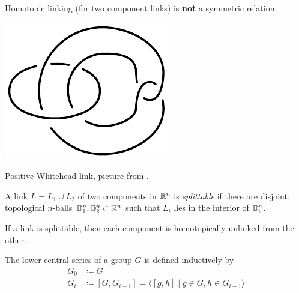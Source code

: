 \begin{remark}
	Homotopic linking (for two component links)
	is \textbf{not} a symmetric relation.
	\begin{marginfigure}
		\begin{center}
			\includegraphics[width=0.5\linewidth]{./pictures/positive_whitehead_link.pdf}
		\end{center}
		\caption{Positive Whitehead link,
			picture from \citep{meier2015distinguishing}.}
		\label{fig:positive_whitehead_link}
	\end{marginfigure}
\end{remark}

\begin{definition}
	A link $L = L_{1} \cup L_{2}$ of two components in $\mathbb{R}^{n}$
	is \textit{splittable} 
	if there are disjoint, topological $n$-balls $\mathbb{D}^{n}_{1}, \mathbb{D}^{n}_{2} \subset \mathbb{R}^{n}$
	such that $L_{i}$ lies in the interior of $\mathbb{D}^{n}_{i}$.
\end{definition}

\begin{proposition}
	\label{prop:splittable_implies_homotopically_unlinked}
	If a link is splittable, then each component is homotopically
	unlinked from the other.
\end{proposition}
	

\begin{definition}
	The lower central series of a group $G$ is defined inductively
	by 
	\begin{align*}
		G_{0} & \coloneqq G \\
		G_{i} & \coloneqq [G, G_{i-1}] = \langle [g, h] \mid g \in G, h \in G_{i-1} \rangle
	\end{align*}
\end{definition}

